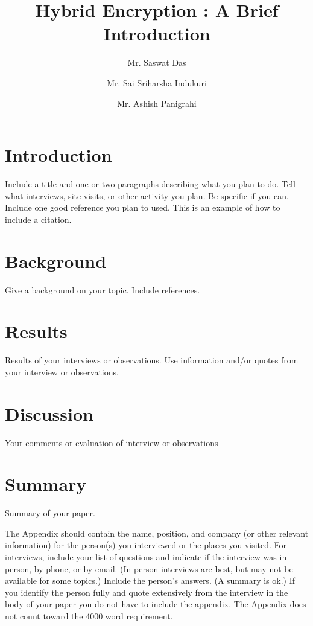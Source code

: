 \documentclass[journal]{IEEEtran}
\begin{document}
\title{Hybrid Encryption : A Brief Introduction}

\author[1]{Mr. Saswat Das}%
\author[2]{Mr. Sai Sriharsha Indukuri}\author[3]{Mr. Ashish Panigrahi}%

\maketitle


\section{Introduction }
Include a title and one or two paragraphs describing what you plan to do. Tell what interviews, site visits, or other activity you plan. Be specific if you can. Include  one good reference you plan to used. This is an example of how to include a citation.

\section{Background}
Give a background on your topic. Include references.

\section{Results}
Results of your interviews or observations. Use information and/or quotes from your interview or observations.

\section{Discussion}
Your comments or evaluation of interview or observations

\section{Summary}
Summary of your paper.

\appendix
The Appendix should contain the name, position, and company (or other relevant information) for the person(s) you interviewed or the places you visited.
For interviews, include your list of questions and indicate if the interview was in person, by phone, or by email.
(In-person interviews are best, but may not be available for some topics.) Include the person's answers.
(A summary is ok.) If you identify the person fully and quote extensively from the interview in the body of your paper you do not have to include the appendix.
The Appendix does not count toward the 4000 word requirement.
\end{document}
